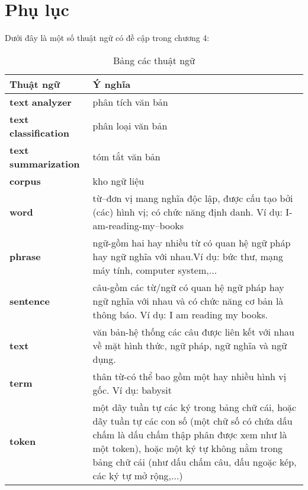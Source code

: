 \section{Phụ lục}
Dưới đây là một số thuật ngữ có đề cập trong chương 4:
\clearpage
\begin{table}[htp!]
    \centering
    \caption{Bảng các thuật ngữ}
    \label{tb:thuat_ngu}
    \begin{tabular}{ |p{3cm}|p{8cm}| }
    \hline
    	\textbf{Thuật ngữ} & Ý nghĩa \\
    \hline
    	\textbf{text} \newline \textbf{analyzer} & phân tích văn bản \\
    \hline
    	\textbf{text} \newline \textbf{classification} & phân loại văn bản \\
    \hline
    	\textbf{text} \newline \textbf{summarization} & tóm tắt văn bản \\
    \hline
    	\textbf{corpus} & kho ngữ liệu \\
    \hline
        \textbf{word} & từ–đơn vị mang nghĩa độc lập, được cấu tạo bởi (các) hình vị; có chức năng định danh. \newline Ví dụ: I-am-reading-my–books   \\
    \hline
        \textbf{phrase} & ngữ-gồm hai hay nhiều từ có quan hệ ngữ pháp hay ngữ nghĩa với nhau.\newline Ví dụ: bức thư, mạng máy tính, computer system,...    \\
    \hline
    	\textbf{sentence} & câu-gồm các từ/ngữ có quan hệ ngữ pháp hay ngữ nghĩa với nhau và có chức năng cơ bản là thông báo. \newline Ví dụ: I am reading my books.    \\
    \hline
    	\textbf{text} & văn bản-hệ thống các câu được liên kết với nhau về mặt hình thức, ngữ pháp, ngữ nghĩa và ngữ dụng.   \\
    \hline
    	\textbf{term} & thân từ-có thể bao gồm một hay nhiều hình vị gốc. \newline Ví dụ: babysit   \\
    \hline
    	\textbf{token} & một dãy tuần tự các ký  trong bảng chữ cái, hoặc dãy tuần tự các con số (một chữ số có chứa dấu chấm là dấu chấm thập phân được xem như là một token), hoặc một ký tự không nằm trong bảng chữ cái (như dấu chấm câu, dấu ngoặc kép, các ký tự mở rộng,...)   \\
    \hline
    \end{tabular}
\end{table}



